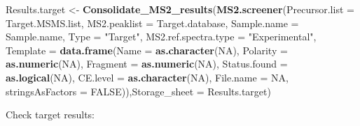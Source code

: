\documentclass[]{article}
\newenvironment{Shaded}{\begin{snugshade}}{\end{snugshade}}
\newcommand{\KeywordTok}[1]{\textcolor[rgb]{0.13,0.29,0.53}{\textbf{#1}}}
\newcommand{\DataTypeTok}[1]{\textcolor[rgb]{0.13,0.29,0.53}{#1}}
\newcommand{\StringTok}[1]{\textcolor[rgb]{0.31,0.60,0.02}{#1}}
\newcommand{\OtherTok}[1]{\textcolor[rgb]{0.56,0.35,0.01}{#1}}
\newcommand{\OperatorTok}[1]{\textcolor[rgb]{0.81,0.36,0.00}{\textbf{#1}}}
\newcommand{\NormalTok}[1]{#1}
\begin{document}
\begin{Shaded}
\begin{Highlighting}[]
\NormalTok{Results.target <-}\StringTok{ }\KeywordTok{Consolidate_MS2_results}\NormalTok{(}\KeywordTok{MS2.screener}\NormalTok{(}\DataTypeTok{Precursor.list =}\NormalTok{  Target.MSMS.list,}
                                                       \DataTypeTok{MS2.peaklist =}\NormalTok{ Target.database,}
                                                       \DataTypeTok{Sample.name =}\NormalTok{ Sample.name,}
                                                       \DataTypeTok{Type =} \StringTok{"Target"}\NormalTok{,}
                                                       \DataTypeTok{MS2.ref.spectra.type =} \StringTok{"Experimental"}\NormalTok{,}
                                                       \DataTypeTok{Template =} \KeywordTok{data.frame}\NormalTok{(}\DataTypeTok{Name =} \KeywordTok{as.character}\NormalTok{(}\OtherTok{NA}\NormalTok{),}
                                                                             \DataTypeTok{Polarity =} \KeywordTok{as.numeric}\NormalTok{(}\OtherTok{NA}\NormalTok{),}
                                                                             \DataTypeTok{Fragment =} \KeywordTok{as.numeric}\NormalTok{(}\OtherTok{NA}\NormalTok{),}
                                                                             \DataTypeTok{Status.found =} \KeywordTok{as.logical}\NormalTok{(}\OtherTok{NA}\NormalTok{),}
                                                                             \DataTypeTok{CE.level =} \KeywordTok{as.character}\NormalTok{(}\OtherTok{NA}\NormalTok{),                         }
                                                                             \DataTypeTok{File.name =} \OtherTok{NA}\NormalTok{, }\DataTypeTok{stringsAsFactors =} \OtherTok{FALSE}\NormalTok{)),}\DataTypeTok{Storage_sheet =}\NormalTok{ Results.target)}
\end{Highlighting}
\end{Shaded}

Check target results:

\begin{Shaded}
\end{Shaded}
\end{document}
